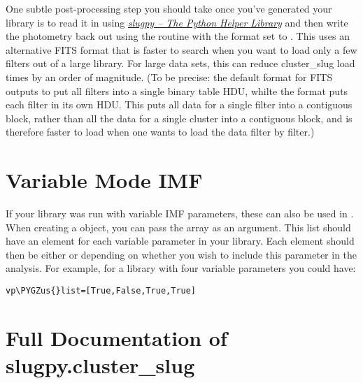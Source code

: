 \documentclass[letterpaper,10pt,english]{sphinxmanual}
\def\PYGZus{\char`\_}
\begin{document}
One subtle post-processing step you should take once you've generated your library is to read it in using {\hyperref[slugpy:sec\string-slugpy]{\emph{slugpy -- The Python Helper Library}}} and then write the photometry back out using the  routine with the format set to . This uses an alternative FITS format that is faster to search when you want to load only a few filters out of a large library. For large data sets, this can reduce cluster\_slug load times by an order of magnitude. (To be precise: the default format for FITS outputs to put all filters into a single binary table HDU, whilte the  format puts each filter in its own HDU. This puts all data for a single filter into a contiguous block, rather than all the data for a single cluster into a contiguous block, and is therefore faster to load when one wants to load the data filter by filter.)


\section{Variable Mode IMF}
\label{cluster_slug:variable-mode-imf}
If your library was run with variable IMF parameters, these can also be used in . When creating a  object, you can pass the array  as an argument. This list should have an element for each variable parameter in your library. Each element should then be either  or  depending on whether you wish to include this parameter in the analysis.
For example, for a library with four variable parameters you could have:

\begin{Verbatim}[commandchars=\\\{\}]
vp\PYGZus{}list=[True,False,True,True]
\end{Verbatim}


\section{Full Documentation of slugpy.cluster\_slug}
\label{cluster_slug:ssec-cluster-slug-full}\label{cluster_slug:full-documentation-of-slugpy-cluster-slug}
\end{document}
